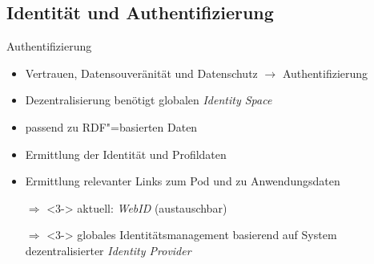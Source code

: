 


\subsection{Identität und Authentifizierung}

\begin{frame}{Authentifizierung \footnotesize\cite{sambraSolidPlatformDecentralized2016}}
    \begin{itemize}
        \item Vertrauen, Datensouveränität und Datenschutz $\to$ Authentifizierung
        \item Dezentralisierung benötigt globalen \emph{Identity Space}
        
        \item<2-> passend zu RDF"=basierten Daten
        \item<2-> Ermittlung der Identität und Profildaten
        \item<2-> Ermittlung relevanter Links zum Pod und zu Anwendungsdaten
        
        \item[$\Rightarrow$]<3-> aktuell: \emph{WebID} (austauschbar)
        \item[$\Rightarrow$]<3-> globales Identitätsmanagement basierend auf System dezentralisierter \emph{Identity Provider}
    \end{itemize}
\end{frame}



